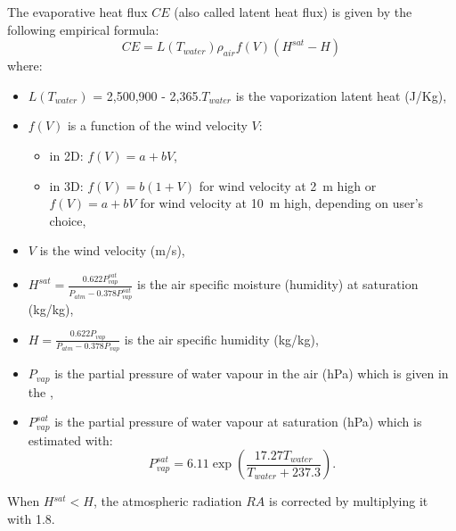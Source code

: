 The evaporative heat flux $CE$ (also called latent heat flux)
is given by the following empirical formula:
\begin{equation*}
CE = L(T_{water})\rho_{air}f(V) \left(H^{sat}-H \right)
\end{equation*}
where:
\begin{itemize}
\item $L(T_{water})$ = 2,500,900 - 2,365.$T_{water}$ is the vaporization latent heat (J/Kg),
\item $f(V)$ is a function of the wind velocity $V$:
  \begin{itemize}
  \item in 2D: $f(V) = a+bV$,
  \item in 3D: $f(V) = b(1+V)$ for wind velocity at 2~m high
    or $f(V) = a+bV$ for wind velocity at 10~m high,
    depending on user's choice,
  \end{itemize}
\item $V$ is the wind velocity (m/s),
\item $H^{sat}=\frac{0.622P^{sat}_{vap}}{P_{atm}-0.378P^{sat}_{vap}}$
is the air specific moisture (humidity) at saturation (kg/kg),
\item $H = \frac{0.622P_{vap}}{P_{atm}-0.378P_{vap}}$ is the air specific humidity (kg/kg),
\item $P_{vap}$ is the partial pressure of water vapour in the air (hPa)
which is given in the ,
\item $P^{sat}_{vap}$ is the partial pressure of water vapour at saturation (hPa) which is estimated with:
\begin{equation*}
P^{sat}_{vap} = 6.11 \exp \left(\frac{17.27T_{water}}{T_{water}+237.3} \right).
\end{equation*}
\end{itemize}

When $H{}^{sat} < H$, the atmospheric radiation $RA$ is corrected by multiplying it with 1.8.
